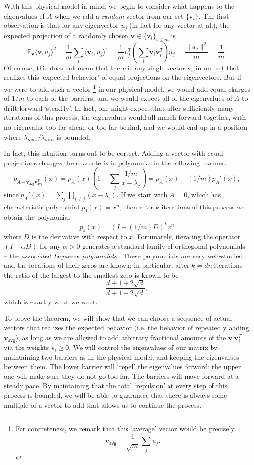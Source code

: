 \documentclass[12pt]{article}
\renewcommand{\v}{\mathbf{v}}
\renewcommand{\v}{\mathbf{v}}
\begin{document}
With this physical model in mind, we begin to consider what happens to the
  eigenvalues of $A$ when we add a {\em random} vector from our set $\{\v_i\}$.
The first observation is that for any eigenvector $u_j$ (in fact for any vector
  at all), the expected projection of a randomly chosen $\v\in\{\v_i\}_{i\le m}$
  is 
\[ \mathbb{E}_\v \langle \v,u_j\rangle^2 = \frac{1}{m}\sum_i \langle \v_i,u_j\rangle^2 = \frac{1}{m} u_j^T\left(\sum_i
\v_i\v_i^T\right)u_j = \frac{\|u_j\|^2}{m}=\frac{1}{m}.\]
Of course, this does not mean that there is any single vector $\v_i$ in
  our set that realizes this `expected behavior' of equal projections on the
  eigenvectors.
But if we were to add such a vector
\footnote{For concreteness, we remark that this `average' vector would be
  precisely
\[ \v_\textsf{avg} = \frac{1}{\sqrt{m}}\sum_j u_j.\]}
 in our physical model, we would add equal 
  charges of $1/m$ to each of the barriers, and we would expect all of the
  eigenvalues of $A$ to drift forward `steadily'.
In fact, one might expect that after sufficiently many iterations of this
  process, the eigenvalues would all march forward together, with no eigenvalue
  too far ahead or too far behind, and we would 
  end up in a position where $\lambda_{max}/\lambda_{min}$ is bounded.

In fact, this intuition turns out to be correct. 
Adding a vector with equal projections changes the characteristic polynomial 
  in the following manner:
\[ p_{A+\v_\textsf{avg}\v_\textsf{avg}^T}(x)=p_A(x)\left(1-\sum_j\frac{1/m}{x-\lambda_j}\right) =
p_A(x)-(1/m)p_A'(x),\]
since $p_A'(x) = \sum_j \prod_{i\neq j} (x-\lambda_i)$. 
If we start with $A=0$, which has characteristic polynomial $p_0(x)=x^n$,  
  then after $k$ iterations of this process we obtain the polynomial
  \[ p_{k}(x) = (I-(1/m)D)^k x^n\]
where $D$ is the derivative with respect to $x$.
Fortunately, iterating the operator $(I-\alpha D)$ for any
$\alpha>0$
  generates a standard family of orthogonal polynomials -- the {\em associated
  Laguerre polynomials} \cite{dette}. 
These polynomials are very well-studied and the locations of their zeros are
  known; in particular, after $k=dn$ iterations the ratio of the largest to the
  smallest zero is known \cite{dette} to be
  \[ \frac{d+1+2\sqrt{d}}{d+1-2\sqrt{d}},\]
  which is exactly what we want.

To prove the theorem, we will show that we can choose a sequence of actual vectors
  that realizes the expected behavior (i.e. the behavior of repeatedly adding $\v_\textsf{avg}$),
  as long as we are allowed to add 
  arbitrary fractional amounts of the $\v_i\v_i^T$ via the weights $s_i\ge 0$.
We will control the eigenvalues of our matrix by maintaining two barriers as 
  in the physical model, and keeping the eigenvalues between them. 
The lower barrier will `repel' the eigenvalues forward; the upper one will make sure
  they do not go too far. 
The barriers will move forward at a steady pace.
By maintaining that the total `repulsion' at every step of this process is
  bounded, we will be able to guarantee that there is always some multiple of 
  a vector to add that allows us to continue the process.
\end{document}
